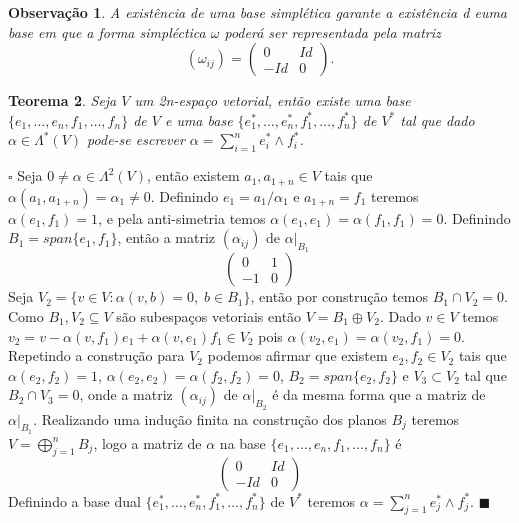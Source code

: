 \documentclass[12pt]{book}
\newtheorem{teorema}{Teorema}[section]
\newtheorem{observacao}[teorema]{Observação}
\newenvironment{prova}[1]{$\square$ #1}{\hfill$\blacksquare$}
\begin{document}
	\begin{observacao}\label{observacao_existencia_base_simpletica}
		A existência de uma base simplética garante a existência d euma base em que a forma simpléctica $\omega$ poderá ser representada pela matriz
		$$
		(\omega_{ij}) =\left(
		\begin{array}{cc}
		0 & Id
		\\
		-Id & 0
		\end{array}
		\right).
		$$
	\end{observacao}
	
	\begin{teorema}
		Seja $V$ um 2n-espaço vetorial, então existe uma base $\{ e_{1},\dots, e_{n}, f_{1},\dots, f_{n}\}$ de $V$ e uma base $\{e_{1}^{*}, \dots, e_{n}^{*}, f_{1}^{*}, \dots,f_{n}^{*}\}$ de $V^{*}$ tal que dado $\alpha \in \Lambda^{*}(V)$ pode-se escrever $\alpha = \sum_{i=1}^{n} e^{*}_{i}\wedge f^{*}_{i}$.
	\end{teorema}
	\begin{prova}
		Seja $0\neq \alpha \in \Lambda^{2}(V) $, então existem $ a_{1}, a_{1+n} \in V $ tais que $\alpha(a_{1}, a_{1+n}) = \alpha_{1} \neq 0$. Definindo $e_{1} = a_{1}/\alpha_{1}$ e $a_{1+n} = f_{1}$ teremos $\alpha(e_{1}, f_{1}) = 1$, e pela anti-simetria temos $\alpha(e_{1}, e_{1}) = \alpha(f_{1}, f_{1}) = 0$. Definindo $B_{1}=span \{e_{1}, f_{1}\}$, então a matriz $(\alpha_{ij})$ de $\alpha|_{B_{1}}$
		$$
		\left(
		\begin{array}{cc}
		0 & 1
		\\
		-1 & 0
		\end{array}
		\right)
		$$
		Seja  $V_{2} = \{v \in V: \alpha(v, b) = 0,\; b \in B_{1}\}$, então por construção temos $B_{1} \cap V_{2} = 0$. Como $B_{1}, V_{2} \subseteq V$ são subespaços vetoriais então $V = B_{1}\oplus V_{2}$. Dado $v \in V$ temos $v_{2} =v- \alpha(v,f_{1})e_{1} +\alpha(v,e_{1})f_{1} \in V_{2}$ pois $\alpha(v_{2}, e_{1}) = \alpha(v_{2}, f_{1}) = 0$. Repetindo a construção para $V_{2}$ podemos afirmar que existem $e_{2}, f_{2} \in V_{2}$ tais que $\alpha(e_{2}, f_{2}) = 1$, $\alpha(e_{2}, e_{2}) = \alpha(f_{2}, f_{2}) = 0$, $B_{2} = span\{e_{2}, f_{2} \}$ e $V_{3} \subset V_{2}$ tal que $B_{2}\cap V_{3}=0$, onde a matriz $(\alpha_{ij})$ de $\alpha|_{B_{2}}$ é da mesma forma que a matriz de $\alpha|_{B_{1}}$. Realizando uma indução finita na construção dos planos $B_{j}$ teremos $V = \bigoplus_{j=1}^{n}B_{j}$, logo a matriz de $\alpha$ na base  $\{ e_{1},\dots, e_{n}, f_{1},\dots, f_{n}\}$ é
		$$
		\left(
		\begin{array}{cc}
		0 & Id
		\\
		-Id & 0
		\end{array}
		\right)
		$$
		Definindo a base dual $\{e_{1}^{*}, \dots, e_{n}^{*}, f_{1}^{*}, \dots,f_{n}^{*}\}$ de $V^{*}$ teremos $\alpha = \sum_{j=1}^{n}e_{j}^{*}\wedge f_{j}^{*}$.
	\end{prova}
	
\end{document}
